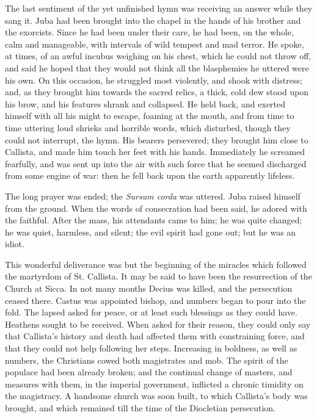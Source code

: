 The last sentiment of the yet unfinished hymn was receiving an
answer while they sang it. Juba had been brought into the chapel in
the hands of his brother and the exorcists. Since he had been under
their care, he had been, on the whole, calm and manageable, with
intervals of wild tempest and mad terror. He spoke, at times, of an
awful incubus weighing on his chest, which he could not throw off, and
said he hoped that they would not think all the blasphemies he uttered
were his own. On this occasion, he struggled most violently, and shook
with distress; and, as they brought him towards the sacred relics, a
thick, cold dew stood upon his brow, and his features shrank and
collapsed. He held back, and exerted himself with all his might to
escape, foaming at the mouth, and from time to time uttering loud
shrieks and horrible words, which disturbed, though they could not
interrupt, the hymn. His bearers persevered; they brought him close to
Callista, and made him touch her feet with his hands. Immediately he
screamed fearfully, and was sent up into the air with such force that
he seemed discharged from some engine of war: then he fell back upon
the earth apparently lifeless.

The long prayer was ended; the \emph{Sursum corda} was uttered.
Juba raised himself from the ground. When the words of consecration
had been said, he adored with the faithful. After the mass, his
attendants came to him; he was quite changed; he was quiet,
harmless, and silent; the evil spirit had gone out; but he was an
idiot.

This wonderful deliverance was but the beginning of the miracles
which followed the martyrdom of St. Callista. It may be said to have
been the resurrection of the Church at Sicca. In not many months
Decius was killed, and the persecution ceased there. Castus was
appointed bishop, and numbers began to pour into the fold. The lapsed
asked for peace, or at least such blessings as they could have.
Heathens sought to be received. When asked for their reason, they
could only say that Callista's history and death had affected them
with constraining force, and that they could not help following her
steps. Increasing in boldness, as well as numbers, the Christians
cowed both magistrates and mob. The spirit of the populace had been
already broken; and the continual change of masters, and measures with
them, in the imperial government, inflicted a chronic timidity on the
magistracy. A handsome church was soon built, to which Callista's body
was brought, and which remained till the time of the Diocletian
persecution.

